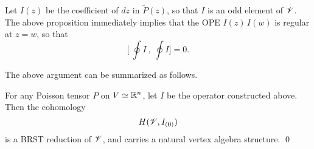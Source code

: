 Let $I (z)$ be the coefficient of $d z$ in $\widetilde{P} (z)$,
so that $I$ is an odd element of $\mathscr{V}$.
The above proposition immediately implies that the OPE
$I (z) \, I (w)$ is regular at $z = w$, so that
\[
    \Biggl[ \ 
        \oint I \ , \ \oint I
    \Biggr] = 0.
\]

The above argument can be summarized as follows.

\begin{theorem}
    For any Poisson tensor $P$ on $V \simeq \mathbb{R}^n$,
    let $I$ be the operator constructed above.
    Then the cohomology
    \[
        H (\mathscr{V}, I_{(0)})
    \]
    is a BRST reduction of $\mathscr{V}$,
    and carries a natural vertex algebra structure.
    \qed
\end{theorem}





